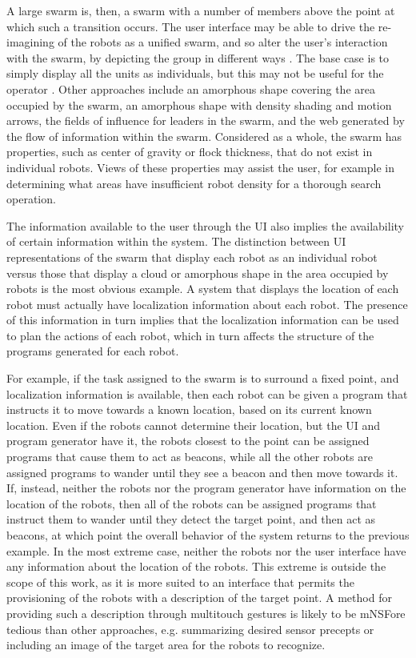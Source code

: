 \documentclass[]{article}
\begin{document}
A large swarm is, then, a swarm with a number of members above the point at which such a transition occurs. 
The user interface may be able to drive the re-imagining of the robots as a unified swarm, and so alter the user's interaction with the swarm, by depicting the group in different ways \cite{manning2015heuristic}.
The base case is to simply display all the units as individuals, but this may not be useful for the operator \cite{coppin2012controlling}. 
Other approaches include an amorphous shape covering the area occupied by the swarm, an amorphous shape with density shading and motion arrows, the fields of influence for leaders in the swarm, and the web generated by the flow of information within the swarm. 
Considered as a whole, the swarm has properties, such as center of gravity or flock thickness, that do not exist in individual robots. 
Views of these properties may assist the user, for example in determining what areas have insufficient robot density for a thorough search operation. 

The information available to the user through the UI also implies the availability of certain information within the system. 
The distinction between UI representations of the swarm that display each robot as an individual robot versus those that display a cloud or amorphous shape in the area occupied by robots is the most obvious example. 
A system that displays the location of each robot must actually have localization information about each robot.
The presence of this information in turn implies that the localization information can be used to plan the actions of each robot, which in turn affects the structure of the programs generated for each robot. 

For example, if the task assigned to the swarm is to surround a fixed point, and localization information is available, then each robot can be given a program that instructs it to move towards a known location, based on its current known location.
Even if the robots cannot determine their location, but the UI and program generator have it, the robots closest to the point can be assigned programs that cause them to act as beacons, while all the other robots are assigned programs to wander until they see a beacon and then move towards it. 
If, instead, neither the robots nor the program generator have information on the location of the robots, then all of the robots can be assigned programs that instruct them to wander until they detect the target point, and then act as beacons, at which point the overall behavior of the system returns to the previous example.
In the most extreme case, neither the robots nor the user interface have any information about the location of the robots. This extreme is outside the scope of this work, as it is more suited to an interface that permits the provisioning of the robots with a description of the target point. A method for providing such a description through multitouch gestures is likely to be mNSFore tedious than other approaches, e.g. summarizing desired sensor precepts or including an image of the target area for the robots to recognize. 
\end{document}
